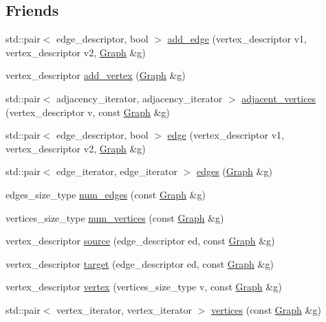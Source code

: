 \subsection*{\-Friends}
\begin{DoxyCompactItemize}
\item 
std\-::pair$<$ edge\-\_\-descriptor, bool $>$ \hyperlink{classGraph_aa6407f7afd5d42e4fd42a8d961d2a0a8}{add\-\_\-edge} (vertex\-\_\-descriptor v1, vertex\-\_\-descriptor v2, \hyperlink{classGraph}{\-Graph} \&g)
\item 
vertex\-\_\-descriptor \hyperlink{classGraph_a460812cc36de1f018d533425648cd957}{add\-\_\-vertex} (\hyperlink{classGraph}{\-Graph} \&g)
\item 
std\-::pair$<$ adjacency\-\_\-iterator, \*
adjacency\-\_\-iterator $>$ \hyperlink{classGraph_a8b26e739f66119542aa05ebf22d95ccc}{adjacent\-\_\-vertices} (vertex\-\_\-descriptor v, const \hyperlink{classGraph}{\-Graph} \&g)
\item 
std\-::pair$<$ edge\-\_\-descriptor, bool $>$ \hyperlink{classGraph_adb12e656aebb03ea5118a95399f45444}{edge} (vertex\-\_\-descriptor v1, vertex\-\_\-descriptor v2, \hyperlink{classGraph}{\-Graph} \&g)
\item 
std\-::pair$<$ edge\-\_\-iterator, \*
edge\-\_\-iterator $>$ \hyperlink{classGraph_a57c3fa041ccb795d2b25e1094993c379}{edges} (\hyperlink{classGraph}{\-Graph} \&g)
\item 
edges\-\_\-size\-\_\-type \hyperlink{classGraph_a8762ff8f5b09fea3fdcfb92c2648336e}{num\-\_\-edges} (const \hyperlink{classGraph}{\-Graph} \&g)
\item 
vertices\-\_\-size\-\_\-type \hyperlink{classGraph_a58495c0a2630da064db06001bbee4b83}{num\-\_\-vertices} (const \hyperlink{classGraph}{\-Graph} \&g)
\item 
vertex\-\_\-descriptor \hyperlink{classGraph_abeea1d6e4e84c501f639fb547f46a732}{source} (edge\-\_\-descriptor ed, const \hyperlink{classGraph}{\-Graph} \&g)
\item 
vertex\-\_\-descriptor \hyperlink{classGraph_a5faf1143ace31bbc5e269a15a1b73829}{target} (edge\-\_\-descriptor ed, const \hyperlink{classGraph}{\-Graph} \&g)
\item 
vertex\-\_\-descriptor \hyperlink{classGraph_aee1ef7db65385d0531a828366cf71b4c}{vertex} (vertices\-\_\-size\-\_\-type v, const \hyperlink{classGraph}{\-Graph} \&g)
\item 
std\-::pair$<$ vertex\-\_\-iterator, \*
vertex\-\_\-iterator $>$ \hyperlink{classGraph_a8af8c02507f2320f17008c3d7e7a471c}{vertices} (const \hyperlink{classGraph}{\-Graph} \&g)
\end{DoxyCompactItemize}


